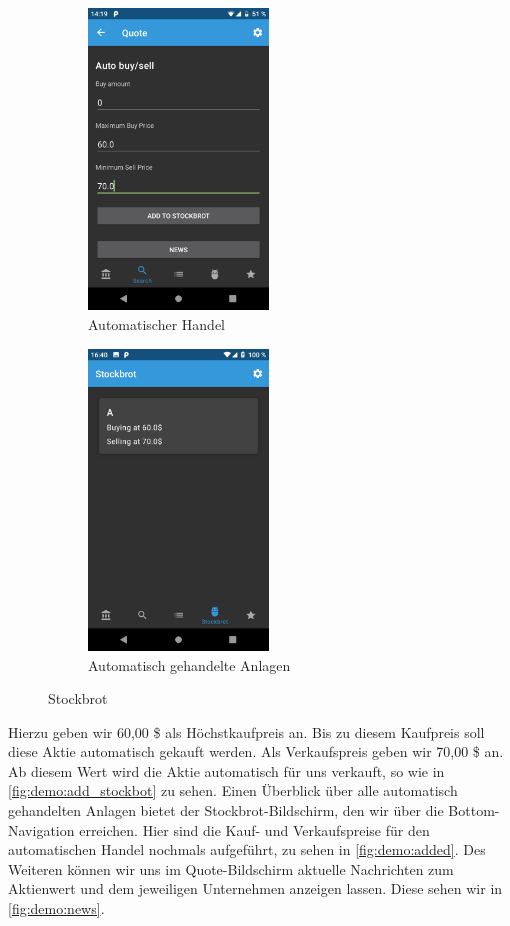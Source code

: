 \documentclass[a4paper]{article}
\begin{document}
\begin{figure}[H]
	\begin{subfigure}{.5\textwidth}
		\centering
		\includegraphics[height=8cm,keepaspectratio]{./images/demo/add_stockbot.png}
		\caption{Automatischer Handel}
		\label{fig:demo:add_stockbot}
	\end{subfigure}
	\begin{subfigure}{.5\textwidth}
		\centering
		\includegraphics[height=8cm,keepaspectratio]{./images/demo/added_stockbot_view.png}
		\caption{Automatisch gehandelte Anlagen}
		\label{fig:demo:added}
	\end{subfigure}
	\caption{Stockbrot}
	\label{fig:demo:bot}
\end{figure}

Hierzu geben wir 60,00 \$ als Höchstkaufpreis an. Bis zu diesem Kaufpreis soll diese Aktie automatisch gekauft werden. Als Verkaufspreis geben wir 70,00 \$ an. Ab diesem Wert wird die Aktie automatisch für uns verkauft, so wie in \autoref{fig:demo:add_stockbot} zu sehen. Einen Überblick über alle automatisch gehandelten Anlagen bietet der Stockbrot-Bildschirm, den wir über die Bottom-Navigation erreichen. Hier sind die Kauf- und Verkaufspreise für den automatischen Handel nochmals aufgeführt, zu sehen in  \autoref{fig:demo:added}.\newline
Des Weiteren können wir uns im Quote-Bildschirm aktuelle Nachrichten zum Aktienwert und dem jeweiligen Unternehmen anzeigen lassen. Diese sehen wir in \autoref{fig:demo:news}.
\end{document}
